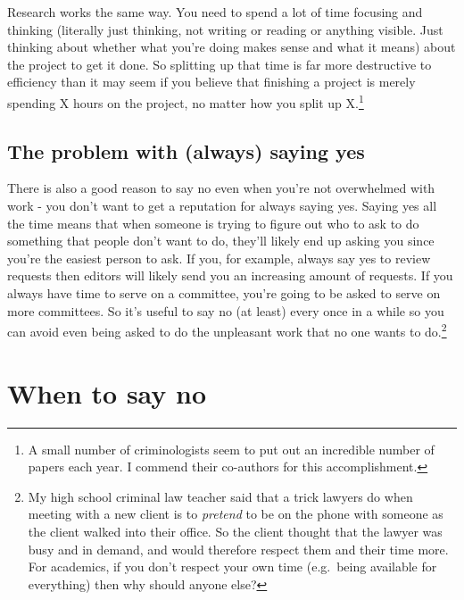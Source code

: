 \documentclass[
  12pt,
  openany]{book}
\begin{document}
Research works the same way. You need to spend a lot of time focusing and thinking (literally just thinking, not writing or reading or anything visible. Just thinking about whether what you're doing makes sense and what it means) about the project to get it done. So splitting up that time is far more destructive to efficiency than it may seem if you believe that finishing a project is merely spending X hours on the project, no matter how you split up X.\footnote{A small number of criminologists seem to put out an incredible number of papers each year. I commend their co-authors for this accomplishment.}

\hypertarget{the-problem-with-always-saying-yes}{%
\subsection{The problem with (always) saying yes}\label{the-problem-with-always-saying-yes}}

There is also a good reason to say no even when you're not overwhelmed with work - you don't want to get a reputation for always saying yes. Saying yes all the time means that when someone is trying to figure out who to ask to do something that people don't want to do, they'll likely end up asking you since you're the easiest person to ask. If you, for example, always say yes to review requests then editors will likely send you an increasing amount of requests. If you always have time to serve on a committee, you're going to be asked to serve on more committees. So it's useful to say no (at least) every once in a while so you can avoid even being asked to do the unpleasant work that no one wants to do.\footnote{My high school criminal law teacher said that a trick lawyers do when meeting with a new client is to \emph{pretend} to be on the phone with someone as the client walked into their office. So the client thought that the lawyer was busy and in demand, and would therefore respect them and their time more. For academics, if you don't respect your own time (e.g.~being available for everything) then why should anyone else?}

\hypertarget{when-to-say-no}{%
\section{When to say no}\label{when-to-say-no}}
\end{document}
